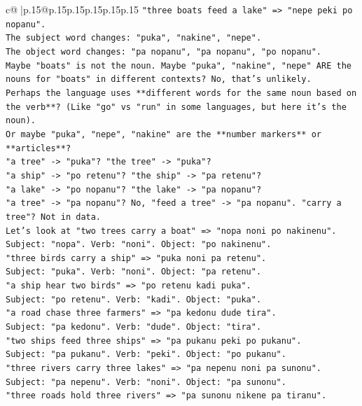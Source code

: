 \documentclass{article}
\begin{document}
{\begin{supertabular}{c@{$\;$}|p{.15\linewidth}@{}p{.15\linewidth}p{.15\linewidth}p{.15\linewidth}p{.15\linewidth}p{.15\linewidth}}
{{{\texttt{"three boats feed a lake" => "nepe peki po nopanu".} \\
\texttt{The subject word changes: "puka", "nakine", "nepe".} \\
\texttt{The object word changes: "pa nopanu", "pa nopanu", "po nopanu".} \\
\texttt{Maybe "boats" is not the noun. Maybe "puka", "nakine", "nepe" ARE the nouns for "boats" in different contexts? No, that's unlikely.} \\
\texttt{Perhaps the language uses **different words for the same noun based on the verb**? (Like "go" vs "run" in some languages, but here it's the noun).} \\
\texttt{Or maybe "puka", "nepe", "nakine" are the **number markers** or **articles**?} \\
\texttt{"a tree" {-}> "puka"? "the tree" {-}> "puka"?} \\
\texttt{"a ship" {-}> "po retenu"? "the ship" {-}> "pa retenu"?} \\
\texttt{"a lake" {-}> "po nopanu"? "the lake" {-}> "pa nopanu"?} \\
\texttt{"a tree" {-}> "pa nopanu"? No, "feed a tree" {-}> "pa nopanu". "carry a tree"? Not in data.} \\
\texttt{Let's look at "two trees carry a boat" => "nopa noni po nakinenu".} \\
\texttt{Subject: "nopa". Verb: "noni". Object: "po nakinenu".} \\
\texttt{"three birds carry a ship" => "puka noni pa retenu".} \\
\texttt{Subject: "puka". Verb: "noni". Object: "pa retenu".} \\
\texttt{"a ship hear two birds" => "po retenu kadi puka".} \\
\texttt{Subject: "po retenu". Verb: "kadi". Object: "puka".} \\
\texttt{"a road chase three farmers" => "pa kedonu dude tira".} \\
\texttt{Subject: "pa kedonu". Verb: "dude". Object: "tira".} \\
\texttt{"two ships feed three ships" => "pa pukanu peki po pukanu".} \\
\texttt{Subject: "pa pukanu". Verb: "peki". Object: "po pukanu".} \\
\texttt{"three rivers carry three lakes" => "pa nepenu noni pa sunonu".} \\
\texttt{Subject: "pa nepenu". Verb: "noni". Object: "pa sunonu".} \\
\texttt{"three roads hold three rivers" => "pa sunonu nikene pa tiranu".} \\
}}}
\end{supertabular}}
\end{document}
